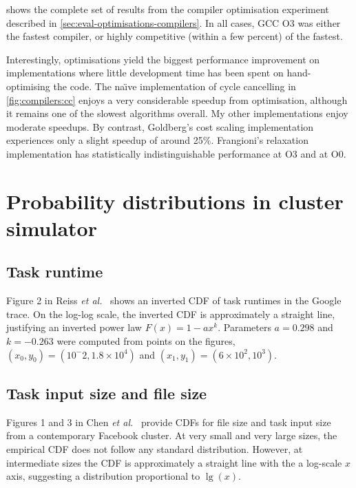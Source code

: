  shows the complete set of results from the compiler optimisation experiment described in \cref{sec:eval-optimisations-compilers}. In all cases, GCC O3 was either the fastest compiler, or highly competitive (within a few percent) of the fastest. 

Interestingly, optimisations yield the biggest performance improvement on implementations where little development time has been spent on hand-optimising the code. The na\"{\i}ve implementation of cycle cancelling in \cref{fig:compilers:cc} enjoys a very considerable speedup from optimisation, although it remains one of the slowest algorithms overall\footnotemark. My other implementations enjoy moderate speedups. By contrast, Goldberg's cost scaling implementation experiences only a slight speedup of around 25\%. Frangioni's relaxation implementation has statistically indistinguishable performance at O3 and at O0.

\section{Probability distributions in cluster simulator} \label{appendix:test-distributions}

\subsection{Task runtime}

Figure 2 in Reiss \textit{et al.}~\cite{Reiss:2012} shows an inverted CDF of task runtimes in the Google trace. On the log-log scale, the inverted CDF is approximately a straight line, justifying an inverted power law $F(x) = 1 - ax^k$. Parameters $a = 0.298$ and $k=-0.263$ were computed from points on the figures, $\left(x_0,y_0\right) = \left(10^-2,1.8\times 10^4\right)$ and $\left(x_1,y_1\right)=\left(6\times 10^2, 10^3\right)$.

\subsection{Task input size and file size}

Figures 1 and 3 in Chen \textit{et al.}~\cite{Chen:2012} provide CDFs for file size and task input size from a contemporary Facebook cluster. At very small and very large sizes, the empirical CDF does not follow any standard distribution. However, at intermediate sizes the CDF is approximately a straight line with the a log-scale $x$ axis, suggesting a distribution proportional to $\lg(x)$.


